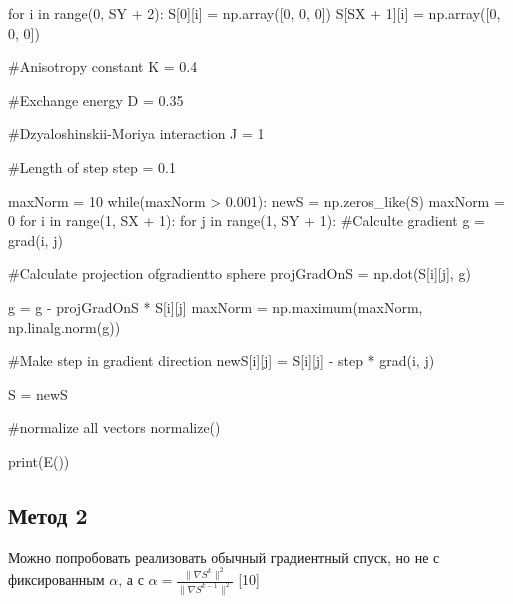 \documentclass[ 12pt,x11names]{article}
\begin{document}
\begin{python}
    for i in range(0, SY + 2):
        S[0][i] = np.array([0, 0, 0])
        S[SX + 1][i] = np.array([0, 0, 0])

    #Anisotropy constant
    K = 0.4

    #Exchange energy
    D = 0.35

    #Dzyaloshinskii-Moriya interaction
    J = 1

    #Length of step
    step = 0.1

    maxNorm = 10
    while(maxNorm > 0.001):
        newS = np.zeros_like(S)
        maxNorm = 0
        for i in range(1, SX + 1):
            for j in range(1, SY + 1):
                #Calculte gradient
                g = grad(i,  j)

                #Calculate projection ofgradientto sphere
                projGradOnS = np.dot(S[i][j], g)

                g = g - projGradOnS * S[i][j]
                maxNorm = np.maximum(maxNorm, np.linalg.norm(g))

                #Make step in gradient direction
                newS[i][j] = S[i][j] - step * grad(i, j)

        S = newS

        #normalize all vectors
        normalize()

print(E())
\end{python}
 \subsection{Метод 2}
 Можно попробовать реализовать обычный градиентный спуск, но не с фиксированным $\alpha$, а с $\alpha = \frac{\| \nabla S^k \|^2}{\| \nabla S^{k-1} \|^2}$ [10]\\
\end{document}

